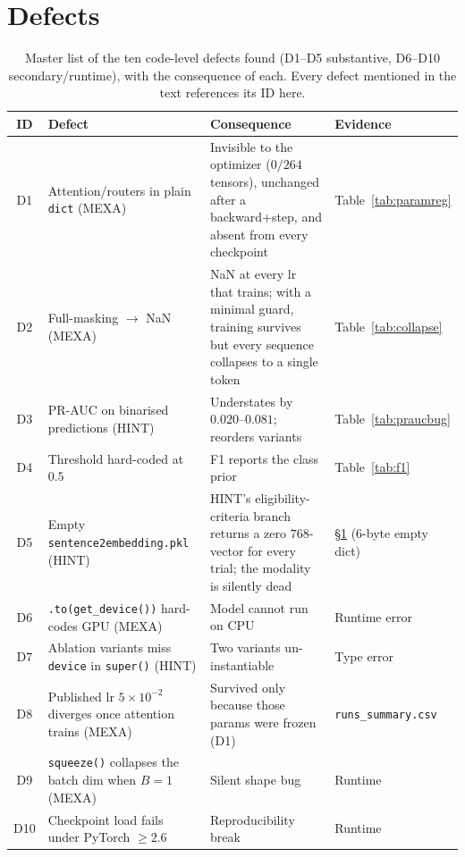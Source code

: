 \documentclass[a4paper,fleqn]{cas-sc}
\begin{document}
\section{Defects}
\label{sec:defects}
\begin{table}[t]
\centering\small
\caption{Master list of the ten code-level defects found (D1--D5 substantive, D6--D10
secondary/runtime), with the consequence of each. Every defect mentioned in the text
references its ID here.}
\label{tab:defects}
\begin{tabular}{clp{4.3cm}l}
\toprule
ID & Defect & Consequence & Evidence \\
\midrule
D1 & Attention/routers in plain \texttt{dict} (MEXA) & Invisible to the optimizer ($0/264$ tensors), unchanged after a backward+step, and absent from every checkpoint & Table~\ref{tab:paramreg} \\
D2 & Full-masking $\rightarrow$ NaN (MEXA) & NaN at every lr that trains; with a minimal guard, training survives but every sequence collapses to a single token & Table~\ref{tab:collapse}\\
D3 & PR-AUC on binarised predictions (HINT) & Understates by $0.020$--$0.081$; reorders variants & Table~\ref{tab:praucbug} \\
D4 & Threshold hard-coded at $0.5$ & F1 reports the class prior & Table~\ref{tab:f1} \\
D5 & Empty \texttt{sentence2embedding.pkl} (HINT) & HINT's eligibility-criteria branch returns a zero $768$-vector for every trial; the modality is silently dead & \S\ref{sec:defects} (6-byte empty dict) \\
D6 & \texttt{.to(get\_device())} hard-codes GPU (MEXA) & Model cannot run on CPU & Runtime error \\
D7 & Ablation variants miss \texttt{device} in \texttt{super()} (HINT) & Two variants un-instantiable & Type error \\
D8 & Published lr $5\times10^{-2}$ diverges once attention trains (MEXA) & Survived only because those params were frozen (D1) & \texttt{runs\_summary.csv} \\
D9 & \texttt{squeeze()} collapses the batch dim when $B{=}1$ (MEXA) & Silent shape bug & Runtime \\
D10 & Checkpoint load fails under PyTorch $\ge2.6$ & Reproducibility break & Runtime \\
\bottomrule
\end{tabular}
\end{table}
\end{document}
